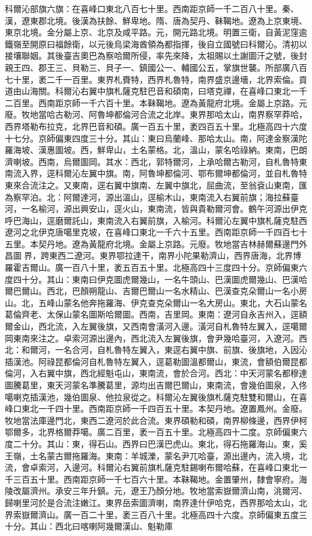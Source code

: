 \begin{pinyinscope}
科爾沁部旗六旗：在喜峰口東北八百七十里。西南距京師一千二百八十里。秦、漢，遼東郡北境。後漢為扶餘、鮮卑地。隋、唐為契丹、靺鞨地。遼為上京東境、東京北境。金分屬上京、北京及咸平路。元，開元路北境。明置三衛，自黃泥窪逾鐵嶺至開原曰福餘衛，以元後烏梁海酋領為都指揮，後自立國號曰科爾沁。清初以接壤聯姻。其後臺吉奧巴為察哈爾所侵，率先來降，太祖賜以土謝圖汗之號，後封親王四、郡王三、貝勒三、貝子一、鎮國公一、輔國公五，掌旗世襲。所部廣八百七十里，袤二千一百里。東界札賚特，西界札魯特，南界盛京邊墻，北界索倫。貢道由山海關。科爾沁右翼中旗札薩克駐巴音和碩南，曰塔克禪，在喜峰口東北一千二百里。西南距京師一千六百十里。本靺鞨地。遼為黃龍府北境。金屬上京路。元廢。牧地當哈古勒河、阿魯坤都倫河合流之北岸。東界那哈太山，南界察罕莽哈，西界塔勒布拉克，北界巴音和碩。廣一百五十里，袤四百五十里。北極高四十六度十七分。京師偏東四度三十分。其山：東曰烏蘭峰、那哈太山。南，阿達金察漢陀羅海坡、漢惠圖坡。西，鮮卑山，土名蒙格。北，溫山，蒙名哈祿納。東南，巴朗濟喇坡。西南，烏爾圖岡。其水：西北，郭特爾河，上承哈爾古勒河，自札魯特東南流入界，逕科爾沁左翼中旗。南，阿魯坤都倫河、鄂布爾坤都倫河，並自札魯特東來合流注之。又東南，逕右翼中旗南、左翼中旗北，屈曲流，至翁袞山東南，匯為察罕泊。北：阿爾達河，源出溫山，逕榆木山，東南流入右翼前旗；海拉蘇臺河，一名榆河，源出興安山，逕火山，東南流，皆與貴勒爾河會。鶴午河源出伊克呼巴海山，逕磨爾託山，東南流入右翼前旗，入榆河。科爾沁左翼中旗札薩克駐西遼河之北伊克唐噶里克坡，在喜峰口東北一千六十五里。西南距京師一千四百七十五里。本契丹地。遼為黃龍府北境。金屬上京路。元廢。牧地當吉林赫爾蘇邊門外昌圖界，跨東西二遼河。東界鄂拉達干，南界小陀果勒濟山，西界唐海，北界博羅霍吉爾山。廣一百八十里，袤五百五十里。北極高四十三度四十分。京師偏東六度四十分。其山：東南曰伊克圖虎爾幾山，一名牛頭山、巴漢圖虎爾幾山、巴漢哈爾巴爾山。西北，巴顏朔龍山、吉爾巴爾山一名水精山、巴漢查克朵爾山一名小房山。北，五峰山蒙名他奔拖羅海、伊克查克朵爾山一名大房山。東北，大石山蒙名葛倫齊老、太保山蒙名圖斯哈爾圖。西南，吉里岡。東南：遼河自永吉州入，逕額爾金山，西北流，入左翼後旗，又西南會潢河入邊。潢河自札魯特左翼入，逕噶爾岡東南來注之。卓索河源出邊內，西北流入左翼後旗，會尹幾哈臺河，入遼河。西北：和爾河，一名合河，自札魯特左翼入，東逕右翼中旗、前旗、後旗地，入因沁插漢池。阿祿昆都倫河自札魯特左翼入，逕葛勒圖溫都爾山，東流，會額伯爾昆都倫河，入右翼中旗，西北經魁屯山，東南流，會於合河。西北：中天河蒙名都穆達圖騰葛里，東天河蒙名準騰葛里，源均出吉爾巴爾山，東南流，會幾伯圖泉，入佟噶喇克插漢池，幾伯圖泉、他拉泉從之。科爾沁左翼後旗札薩克駐雙和爾山，在喜峰口東北一千四十里。西南距京師一千四百五十里。本契丹地。遼置鳳州。金廢。牧地當法庫邊門北，東西二遼河於此合流。東界碩勒和碩，南界柳條邊，西界伊柯鄂爾多，北界格爾莽噶。廣二百里，袤一百五十里。北極高四十二度。京師偏東六度二十分。其山：東，得石山。西界曰巴漢巴虎山。東北，得石拖羅海山。東，奚王嶺，土名蒙古爾拖羅海。東南：羊城濼，蒙名尹兀哈臺，源出邊內，流入境，北流，會卓索河，入邊河。科爾沁右翼前旗札薩克駐錫喇布爾哈蘇，在喜峰口東北一千三百五十里。西南距京師一千七百六十里。本靺鞨地。金置肇州，隸會寧府。海陵改屬濟州。承安三年升鎮。元，遼王乃顏分地。牧地當索嶽爾濟山南，洮爾河、歸喇里河於是合流注嫩江。東界岳索圖濟喇，南界達什伊哈克，西界那哈太山，北界索嶽爾濟山。廣一百二十里，袤三百八十里。北極高四十六度。京師偏東五度三十分。其山：西北曰喀喇阿幾爾漢山、魁勒庫
\end{pinyinscope}
